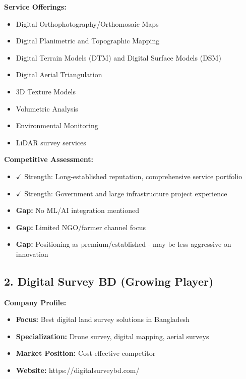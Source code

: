 \textbf{Service Offerings:}
\begin{itemize}
    \item Digital Orthophotography/Orthomosaic Maps
    \item Digital Planimetric and Topographic Mapping
    \item Digital Terrain Models (DTM) and Digital Surface Models (DSM)
    \item Digital Aerial Triangulation
    \item 3D Texture Models
    \item Volumetric Analysis
    \item Environmental Monitoring
    \item LiDAR survey services
\end{itemize}

\textbf{Competitive Assessment:}
\begin{itemize}
    \item \textcolor{AccentGreen}{$\checkmark$ Strength:} Long-established reputation, comprehensive service portfolio
    \item \textcolor{AccentGreen}{$\checkmark$ Strength:} Government and large infrastructure project experience
    \item \textbf{Gap:} No ML/AI integration mentioned
    \item \textbf{Gap:} Limited NGO/farmer channel focus
    \item \textbf{Gap:} Positioning as premium/established - may be less aggressive on innovation
\end{itemize}

\subsection{2. Digital Survey BD (Growing Player)}

\textbf{Company Profile:}
\begin{itemize}
    \item \textbf{Focus:} Best digital land survey solutions in Bangladesh
    \item \textbf{Specialization:} Drone survey, digital mapping, aerial surveys
    \item \textbf{Market Position:} Cost-effective competitor
    \item \textbf{Website:} https://digitalsurveybd.com/
\end{itemize}

